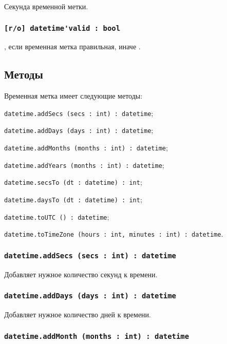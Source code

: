 Секунда временной метки.

\subsubsection{\lstinline|[r/o] datetime'valid : bool|}

\true, если временная метка правильная, иначе \false.

\subsection{Методы}

Временная метка имеет следующие методы:
\begin{icItems}
	\item \lstinline|datetime.addSecs (secs : int) : datetime|;
	\item \lstinline|datetime.addDays (days : int) : datetime|;
	\item \lstinline|datetime.addMonths (months : int) : datetime|;
	\item \lstinline|datetime.addYears (months : int) : datetime|;
	\item \lstinline|datetime.secsTo (dt : datetime) : int|;
	\item \lstinline|datetime.daysTo (dt : datetime) : int|;
	\item \lstinline|datetime.toUTC () : datetime|;
	\item \lstinline|datetime.toTimeZone (hours : int, minutes : int) : datetime|.
\end{icItems}

\subsubsection{\lstinline|datetime.addSecs (secs : int) : datetime|}

Добавляет нужное количество секунд к времени.

\subsubsection{\lstinline|datetime.addDays (days : int) : datetime|}

Добавляет нужное количество дней к времени.

\subsubsection{\lstinline|datetime.addMonth (months : int) : datetime|}

